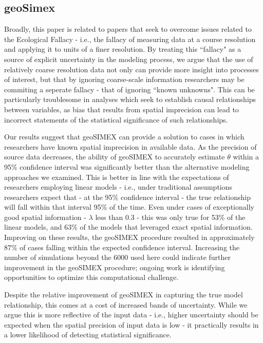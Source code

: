 \subsection{geoSimex}
Broadly, this paper is related to papers that seek to overcome issues related to the Ecological Fallacy - i.e., the fallacy of measuring data at a course resolution and applying it to units of a finer resolution.
By treating this ``fallacy" as a source of explicit uncertainty in the modeling process, we argue that the use of relatively coarse resolution data not only can provide more insight into processes of interest, but that by ignoring coarse-scale information researchers may be commiting a seperate fallacy - that of ignoring ``known unknowns".
This can be particularly troublesome in analyses which seek to establish causal relationships between variables, as bias that results from spatial imprecision can lead to incorrect statements of the statistical significance of such relationships.
\par
Our results suggest that geoSIMEX can provide a solution to cases in which researchers have known spatial imprecision in available data.  
As the precision of source data decreases, the ability of geoSIMEX to accurately estimate $\theta$ within a 95\% confidence interval was significantly better than the alternative modeling approaches we examined.
This is better in line with the expectations of researchers employing linear models - i.e., under traditional assumptions researchers expect that - at the 95\% confidence interval - the true relationship will fall within that interval 95\% of the time.
Even under cases of exceptionally good spatial information - $\lambda$ less than 0.3 - this was only true for 53\% of the linear models, and 63\% of the models that leveraged exact spatial information.
Improving on these results, the geoSIMEX procedure resulted in approximately 87\% of cases falling within the expected confidence interval.  
Increasing the number of simulations beyond the 6000 used here could indicate further improvement in the geoSIMEX procedure; ongoing work is identifying opportunities to optimize this computational challenge.
\par
Despite the relative improvement of geoSIMEX in capturing the true model relationship, this comes at a cost of increased bands of uncertainty.  
While we argue this is more reflective of the input data - i.e., higher uncertainty should be expected when the spatial precision of input data is low - it practically results in a lower likelihood of detecting statistical significance.
